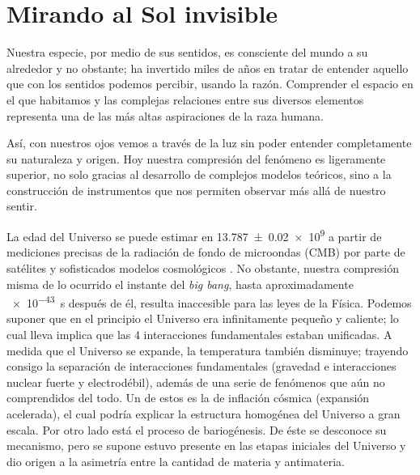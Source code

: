 
\chapter{Mirando al Sol invisible}
\label{chap:uno}

Nuestra especie, por medio de sus sentidos, es consciente del mundo a su alrededor y no obstante; ha invertido miles de años en tratar de entender aquello que con los sentidos podemos percibir, usando la razón. Comprender el espacio en el que habitamos y las complejas relaciones entre sus diversos elementos representa una de las más altas aspiraciones de la raza humana.

Así, con nuestros ojos vemos a través de la luz sin poder entender completamente su naturaleza y origen. Hoy nuestra compresión del fenómeno es ligeramente superior, no solo gracias al desarrollo de complejos modelos teóricos, sino a la construcción de instrumentos que nos permiten observar más allá de nuestro sentir.

La edad del Universo se puede estimar en \SI{13.787(20)e9}{\year} a partir de mediciones precisas de la radiación de fondo de microondas (CMB) por parte de satélites y sofisticados modelos cosmológicos \cite{}. No obstante, nuestra compresión misma de lo ocurrido el instante del \emph{big bang}, hasta aproximadamente \SI{e-43}{\second} después de él, resulta inaccesible para las leyes de la Física. Podemos suponer que en el principio el Universo era infinitamente pequeño y caliente; lo cual lleva implica que las \num{4} interacciones fundamentales estaban unificadas. A medida que el Universo se expande, la temperatura también disminuye; trayendo consigo la separación de interacciones fundamentales (gravedad e interacciones nuclear fuerte y electrodébil), además de una serie de fenómenos que aún no comprendidos del todo. Un de estos es la de inflación cósmica (expansión acelerada), el cual podría explicar la estructura homogénea del Universo a gran escala. Por otro lado está el proceso de bariogénesis. De éste se desconoce su mecanismo, pero se supone estuvo presente en las etapas iniciales del Universo y dio origen a la asimetría entre la cantidad de materia y antimateria.

